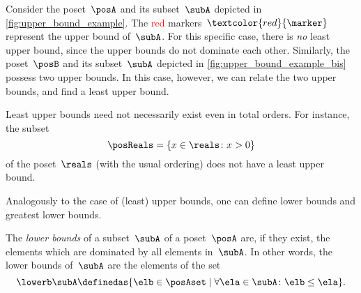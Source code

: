 \begin{example}
    Consider the poset~$\posA$ and its subset~$\subA$ depicted in \cref{fig:upper_bound_example}.
    The \textcolor{red}{red} markers~$\textcolor{red}{\marker}$ represent the upper bound of~$\subA$.
    For this specific case, there is \emph{no} least upper bound, since the upper bounds do not dominate each other.
    Similarly, the poset~$\posB$ and its subset~$\subA$ depicted in \cref{fig:upper_bound_example_bis} possess two upper bounds.
    In this case, however, we can relate the two upper bounds, and find a least upper bound.
\end{example}

\begin{figure*}[h!]
    \caption{}
\end{figure*}
\begin{example}
    Least upper bounds need not necessarily exist even in total orders.
    For instance, the subset
    \begin{equation*}
        \posReals = \{x\in \reals \colon x>0\}
    \end{equation*}
    of the poset~$\reals$ (with the usual ordering) does not have a least upper bound.
\end{example}

Analogously to the case of (least) upper bounds, one can define lower bounds and greatest lower bounds.

\begin{ctdefinition}
    \label{def:greatest-lower-bound}
    The \emph{lower bounds} of a subset~$\subA$ of a poset~$\posA$ are, if they exist, the elements which are dominated by all elements in~$\subA$.
    In other words, the lower bounds of~$\subA$ are the elements of the set
    \begin{equation*}
        \lowerb \subA\definedas \{ \elb \in \posAset \mid \forall \ela \in \subA  \colon \elb \leq \ela \}.
    \end{equation*}
\end{ctdefinition}

